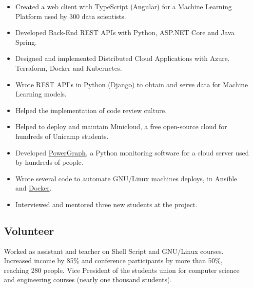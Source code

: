 \documentclass[10pt, a4paper, roman]{moderncv} %
\begin{document}
{
    \begin{itemize}
        \item Created a web client with TypeScript (Angular) for a Machine Learning Platform used by 300 data scientists.
        \item Developed Back-End REST APIs with Python, ASP.NET Core and Java Spring.
	    \item Designed and implemented Distributed Cloud Applications with Azure, Terraform, Docker and Kubernetes.
    \end{itemize}
}

{
    \begin{itemize}
        \item Wrote REST API's in Python (Django) to obtain and serve data for Machine Learning models. 
        \item Helped the implementation of code review culture.
    \end{itemize}
}
{
    \begin{itemize}
        \item Helped to deploy and maintain Minicloud, a free open-source cloud for hundreds of Unicamp students.
        \item Developed \href{https://github.com/Guilhermeslucas/powergraph}{PowerGraph}, a Python monitoring software for a cloud server used by hundreds of people.
        \item Wrote several code to automate GNU/Linux machines deploys, in \href{https://github.com/Guilhermeslucas/Ansible-Code}{Ansible} and 
            \href{https://github.com/Guilhermeslucas/Dockerfiles}{Docker}.
        \item Interviewed and mentored three new students at the project.
    \end{itemize}
}
\subsection{Volunteer}
{
    Worked as assistant and teacher on Shell Script and GNU/Linux courses.
}
{
    Increased income by 85\% and conference participants by more than 50\%, reaching 280 people.
}
{
    Vice President of the students union for computer science and engineering courses (nearly one thousand students).
}
\end{document}
